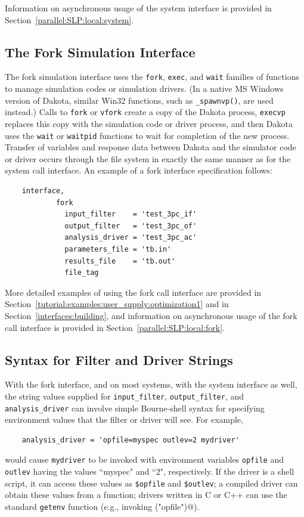 Information on asynchronous usage of the system interface is provided in
Section~\ref{parallel:SLP:local:system}.

\subsection{The Fork Simulation Interface}\label{interfaces:fork}

The fork simulation interface uses the \texttt{fork}, \texttt{exec},
and \texttt{wait} families of functions to manage simulation codes or
simulation drivers. (In a native MS Windows version of Dakota, similar
Win32 functions, such as \texttt{\_spawnvp()}, are used instead.)
Calls to \texttt{fork} or \texttt{vfork} create a
copy of the Dakota process, \texttt{execvp} replaces this copy with
the simulation code or driver process, and then Dakota uses the
\texttt{wait} or \texttt{waitpid} functions to wait for completion of
the new process. Transfer of variables and response data between
Dakota and the simulator code or driver occurs through the file system
in exactly the same manner as for the system call interface. An
example of a fork interface specification follows:
\begin{small}
\begin{verbatim}
    interface,
            fork
              input_filter    = 'test_3pc_if'
              output_filter   = 'test_3pc_of'
              analysis_driver = 'test_3pc_ac'
              parameters_file = 'tb.in'
              results_file    = 'tb.out'
              file_tag
\end{verbatim}
\end{small}

More detailed examples of using the fork call interface are provided
in Section~\ref{tutorial:examples:user_supply:optimization1} and in
Section~\ref{interfaces:building}, and information on asynchronous usage
of the fork call interface is provided in
Section~\ref{parallel:SLP:local:fork}.


\subsection{Syntax for Filter and Driver Strings}\label{interfaces:syntax}

With the fork interface, and on most systems, with the system interface
as well, the string values supplied for \texttt{input\_filter}, \texttt{output\_filter},
and \texttt{analysis\_driver} can involve simple Bourne-shell
syntax for specifying environment values that the filter or driver will see.
For example,
\begin{verbatim}
    analysis_driver = 'opfile=myspec outlev=2 mydriver'
\end{verbatim}
would cause \texttt{mydriver} to be invoked with environment
variables \texttt{opfile} and \texttt{outlev} having the
values ``myspec" and ``2", respectively.  If the driver is a
shell script, it can access these values as \texttt{\$opfile} and
\texttt{\$outlev}; a compiled driver can obtain these values
from a function; drivers written in C or C++ can use the standard
\texttt{getenv} function (e.g., invoking \verb@getenv("opfile")@).

